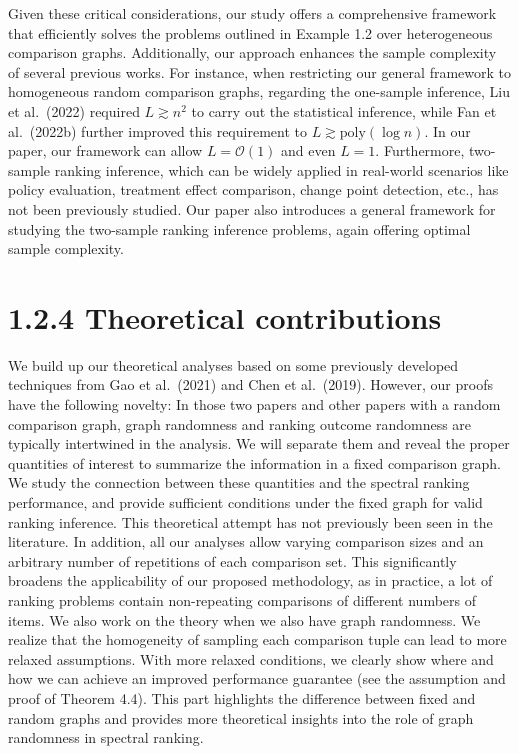 Given these critical considerations, our study offers a comprehensive framework that efficiently solves the problems outlined in Example 1.2 over heterogeneous comparison graphs. Additionally, our approach enhances the sample complexity of several previous works. For instance, when restricting our general framework to homogeneous random comparison graphs, regarding the one-sample inference, Liu et al.~(2022) required \(L \gtrsim n^2\) to carry out the statistical inference, while Fan et al.~(2022b) further improved this requirement to \(L \gtrsim \mathrm{poly}(\log n)\). In our paper, our framework can allow \(L = \mathcal{O}(1)\) and even \(L = 1\). Furthermore, two-sample ranking inference, which can be widely applied in real-world scenarios like policy evaluation, treatment effect comparison, change point detection, etc., has not been previously studied. Our paper also introduces a general framework for studying the two-sample ranking inference problems, again offering optimal sample complexity.

\section{1.2.4 Theoretical contributions}\label{theoretical-contributions}

We build up our theoretical analyses based on some previously developed techniques from Gao et al.~(2021) and Chen et al.~(2019). However, our proofs have the following novelty: In those two papers and other papers with a random comparison graph, graph randomness and ranking outcome randomness are typically intertwined in the analysis. We will separate them and reveal the proper quantities of interest to summarize the information in a fixed comparison graph. We study the connection between these quantities and the spectral ranking performance, and provide sufficient conditions under the fixed graph for valid ranking inference. This theoretical attempt has not previously been seen in the literature. In addition, all our analyses allow varying comparison sizes and an arbitrary number of repetitions of each comparison set. This significantly broadens the applicability of our proposed methodology, as in practice, a lot of ranking problems contain non-repeating comparisons of different numbers of items. We also work on the theory when we also have graph randomness. We realize that the homogeneity of sampling each comparison tuple can lead to more relaxed assumptions. With more relaxed conditions, we clearly show where and how we can achieve an improved performance guarantee (see the assumption and proof of Theorem 4.4). This part highlights the difference between fixed and random graphs and provides more theoretical insights into the role of graph randomness in spectral ranking.

